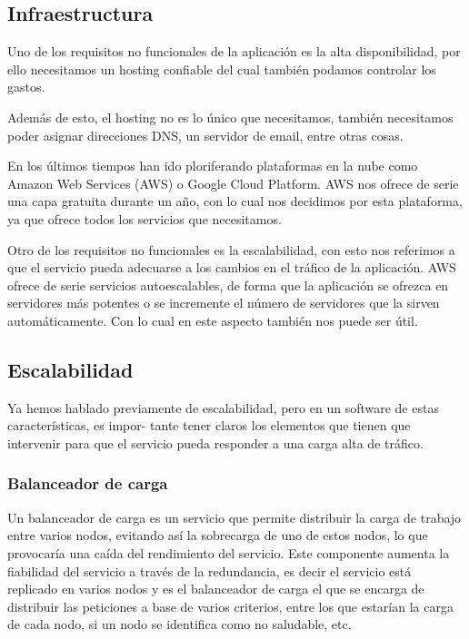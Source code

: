 \documentclass[12pt,a4paperpaper,]{report}
\begin{document}
\subsection{Infraestructura}\label{infraestructura}

Uno de los requisitos no funcionales de la aplicación es la alta
disponibilidad, por ello necesitamos un hosting confiable del cual
también podamos controlar los gastos.

Además de esto, el hosting no es lo único que necesitamos, también
necesitamos poder asignar direcciones DNS, un servidor de email, entre
otras cosas.

En los últimos tiempos han ido ploriferando plataformas en la nube como
Amazon Web Services (AWS) o Google Cloud Platform. AWS nos ofrece de
serie una capa gratuita durante un año, con lo cual nos decidimos por
esta plataforma, ya que ofrece todos los servicios que necesitamos.

Otro de los requisitos no funcionales es la escalabilidad, con esto nos
referimos a que el servicio pueda adecuarse a los cambios en el tráfico
de la aplicación. AWS ofrece de serie servicios autoescalables, de forma
que la aplicación se ofrezca en servidores más potentes o se incremente
el número de servidores que la sirven automáticamente. Con lo cual en
este aspecto también nos puede ser útil.

\subsection{Escalabilidad}\label{escalabilidad}

Ya hemos hablado previamente de escalabilidad, pero en un software de
estas características, es impor- tante tener claros los elementos que
tienen que intervenir para que el servicio pueda responder a una carga
alta de tráfico.

\subsubsection{Balanceador de carga}\label{balanceador-de-carga}

Un balanceador de carga es un servicio que permite distribuir la carga
de trabajo entre varios nodos, evitando así la sobrecarga de uno de
estos nodos, lo que provocaría una caída del rendimiento del servicio.
Este componente aumenta la fiabilidad del servicio a través de la
redundancia, es decir el servicio está replicado en varios nodos y es el
balanceador de carga el que se encarga de distribuir las peticiones a
base de varios criterios, entre los que estarían la carga de cada nodo,
si un nodo se identifica como no saludable, etc.
\end{document}
